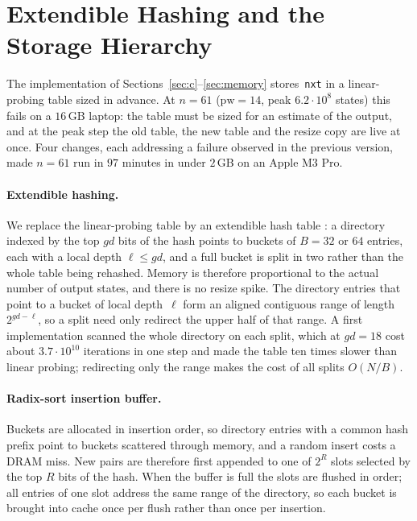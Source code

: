 \documentclass[12pt]{article}
\theoremstyle{definition}
\newcommand{\pw}{\mathrm{pw}}
\newcommand{\nxt}{\texttt{nxt}}
\begin{document}
\section{Extendible Hashing and the Storage Hierarchy}
\label{sec:eh}

The implementation of Sections~\ref{sec:c}--\ref{sec:memory} stores~\nxt{} in a
linear-probing table sized in advance.
At $n=61$ ($\pw=14$, peak $6.2\cdot10^{8}$ states) this fails on a $16$\,GB
laptop: the table must be sized for an estimate of the output, and at the
peak step the old table, the new table and the resize copy are live at once.
Four changes, each addressing a failure observed in the previous version,
made $n=61$ run in $97$ minutes in under $2$\,GB on an Apple M3 Pro.

\paragraph{Extendible hashing.}
We replace the linear-probing table by an extendible hash table
\cite{Fagin}: a directory indexed by the top $gd$ bits of the hash points to
buckets of $B=32$ or $64$ entries, each with a local depth $\ell\le gd$, and
a full bucket is split in two rather than the whole table being rehashed.
Memory is therefore proportional to the actual number of output states, and
there is no resize spike.
The directory entries that point to a bucket of local depth~$\ell$ form an
aligned contiguous range of length $2^{gd-\ell}$, so a split need only
redirect the upper half of that range.
A first implementation scanned the whole directory on each split, which at
$gd=18$ cost about $3.7\cdot10^{10}$ iterations in one step and made the
table ten times slower than linear probing; redirecting only the range makes
the cost of all splits $O(N/B)$.

\paragraph{Radix-sort insertion buffer.}
Buckets are allocated in insertion order, so directory entries with a common
hash prefix point to buckets scattered through memory, and a random insert
costs a DRAM miss.
New pairs are therefore first appended to one of $2^R$ slots selected by the
top $R$ bits of the hash.
When the buffer is full the slots are flushed in order; all entries of one
slot address the same range of the directory, so each bucket is brought into
cache once per flush rather than once per insertion.
\end{document}
